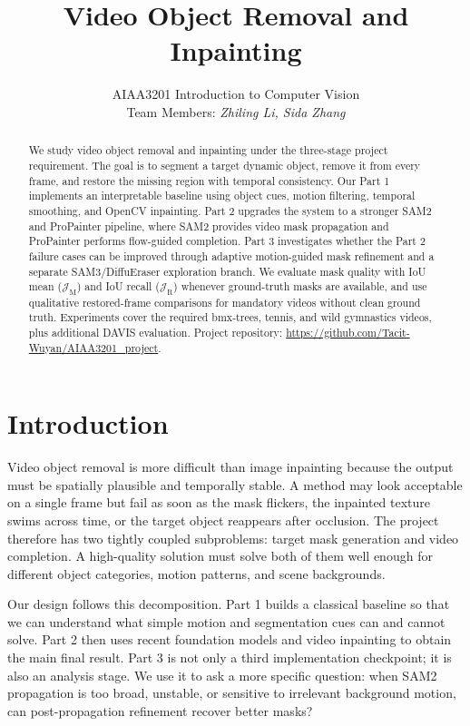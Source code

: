 \documentclass[10pt,twocolumn,letterpaper]{article}
\title{Video Object Removal and Inpainting}
\author{AIAA3201 Introduction to Computer Vision\\
Team Members: \textit{Zhiling Li, Sida Zhang}}
\newcommand{\jm}{\ensuremath{\mathcal{J}_{\mathrm{M}}}}
\newcommand{\jr}{\ensuremath{\mathcal{J}_{\mathrm{R}}}}
\newcommand{\githubrepo}{\url{https://github.com/Tacit-Wuyan/AIAA3201_project}}
\begin{document}
\maketitle

\begin{abstract}
We study video object removal and inpainting under the three-stage project requirement. The goal is to segment a target dynamic object, remove it from every frame, and restore the missing region with temporal consistency. Our Part 1 implements an interpretable baseline using object cues, motion filtering, temporal smoothing, and OpenCV inpainting. Part 2 upgrades the system to a stronger SAM2 and ProPainter pipeline, where SAM2 provides video mask propagation and ProPainter performs flow-guided completion. Part 3 investigates whether the Part 2 failure cases can be improved through adaptive motion-guided mask refinement and a separate SAM3/DiffuEraser exploration branch. We evaluate mask quality with IoU mean (\jm) and IoU recall (\jr) whenever ground-truth masks are available, and use qualitative restored-frame comparisons for mandatory videos without clean ground truth. Experiments cover the required bmx-trees, tennis, and wild gymnastics videos, plus additional DAVIS evaluation. Project repository: \githubrepo.
\end{abstract}

\section{Introduction}
Video object removal is more difficult than image inpainting because the output must be spatially plausible and temporally stable. A method may look acceptable on a single frame but fail as soon as the mask flickers, the inpainted texture swims across time, or the target object reappears after occlusion. The project therefore has two tightly coupled subproblems: target mask generation and video completion. A high-quality solution must solve both of them well enough for different object categories, motion patterns, and scene backgrounds.

Our design follows this decomposition. Part 1 builds a classical baseline so that we can understand what simple motion and segmentation cues can and cannot solve. Part 2 then uses recent foundation models and video inpainting to obtain the main final result. Part 3 is not only a third implementation checkpoint; it is also an analysis stage. We use it to ask a more specific question: when SAM2 propagation is too broad, unstable, or sensitive to irrelevant background motion, can post-propagation refinement recover better masks?
\end{document}
